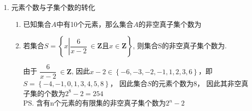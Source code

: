 \begin{enumerate}
\begin{enumerate}
\begin{jieda}
\begin{enumerate}
                综上,实数 $m$ 的取值范围是 $( - \infty , - 3\rbrack$.
            \end{enumerate}
        \end{jieda}
    \end{enumerate}
    \item 元素个数与子集个数的转化
    \begin{enumerate}
        \item 已知集合$A$中有10个元素，那么集合$A$的非空真子集个数为
        \item 若集合$S = \left\{x \left| \dfrac{6}{x-2}\ \in \mathbf{Z} \mbox{且} x \in \mathbf{Z}\right. \right\}$, 则集合S的非空真子集个数为.
        \begin{jieda}
            由于 $\dfrac{6}{x-2}\ \in \mathbf{Z}$, 因此$x-2 \in \left\{-6, -3, -2, -1, 1, 2, 3, 6\right\}$，即 $S = \left\{-4, -1, 0, 1, 3, 4, 5, 8\right\}$， 因此集合$S$的元素个数为8， 因此其非空真子集的个数为$2^8-2=254$ \\
            \ps 含有n个元素的有限集的非空真子集个数为$2^n -2$
        \end{jieda}
    \end{enumerate}
        

\end{enumerate}
